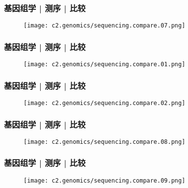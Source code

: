 \begin{frame}
  \frametitle{基因组学 | 测序 | 比较}
  \begin{figure}
    \centering
    \texttt{[image: c2.genomics/sequencing.compare.07.png]}
  \end{figure}
\end{frame}

\begin{frame}
  \frametitle{基因组学 | 测序 | 比较}
  \begin{figure}
    \centering
    \texttt{[image: c2.genomics/sequencing.compare.01.png]}
  \end{figure}
\end{frame}

\begin{frame}
  \frametitle{基因组学 | 测序 | 比较}
  \begin{figure}
    \centering
    \texttt{[image: c2.genomics/sequencing.compare.02.png]}
  \end{figure}
\end{frame}

\begin{frame}
  \frametitle{基因组学 | 测序 | 比较}
  \begin{figure}
    \centering
    \texttt{[image: c2.genomics/sequencing.compare.08.png]}
  \end{figure}
\end{frame}

\begin{frame}
  \frametitle{基因组学 | 测序 | 比较}
  \begin{figure}
    \centering
    \texttt{[image: c2.genomics/sequencing.compare.09.png]}
  \end{figure}
\end{frame}


